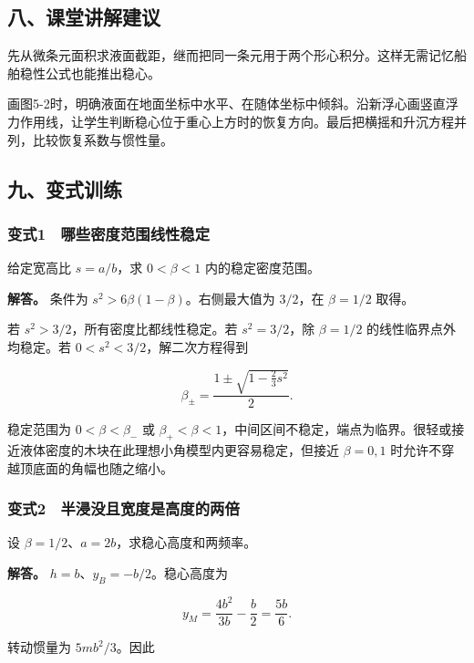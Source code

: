 \documentclass[12pt,a4paper,fontset=fandol]{ctexart}
\begin{document}
\subsection{八、课堂讲解建议}\label{ux516bux8bfeux5802ux8bb2ux89e3ux5efaux8bae-4}

先从微条元面积求液面截距，继而把同一条元用于两个形心积分。这样无需记忆船舶稳性公式也能推出稳心。

画图5-2时，明确液面在地面坐标中水平、在随体坐标中倾斜。沿新浮心画竖直浮力作用线，让学生判断稳心位于重心上方时的恢复方向。最后把横摇和升沉方程并列，比较恢复系数与惯性量。

\subsection{九、变式训练}\label{ux4e5dux53d8ux5f0fux8badux7ec3-4}

\subsubsection{变式1　哪些密度范围线性稳定}\label{ux53d8ux5f0f1-ux54eaux4e9bux5bc6ux5ea6ux8303ux56f4ux7ebfux6027ux7a33ux5b9a}

给定宽高比 \(s=a/b\)，求 \(0<\beta<1\) 内的稳定密度范围。

\textbf{解答。} 条件为 \(s^2>6\beta(1-\beta)\)。右侧最大值为 \(3/2\)，在
\(\beta=1/2\) 取得。

若 \(s^2>3/2\)，所有密度比都线性稳定。若 \(s^2=3/2\)，除 \(\beta=1/2\)
的线性临界点外均稳定。若 \(0<s^2<3/2\)，解二次方程得到

\[
\beta_\pm=\frac{1\pm\sqrt{1-\frac23s^2}}2.
\]

稳定范围为 \(0<\beta<\beta_-\) 或
\(\beta_+<\beta<1\)，中间区间不稳定，端点为临界。很轻或接近液体密度的木块在此理想小角模型内更容易稳定，但接近
\(\beta=0,1\) 时允许不穿越顶底面的角幅也随之缩小。

\subsubsection{变式2　半浸没且宽度是高度的两倍}\label{ux53d8ux5f0f2-ux534aux6d78ux6ca1ux4e14ux5bbdux5ea6ux662fux9ad8ux5ea6ux7684ux4e24ux500d}

设 \(\beta=1/2\)、\(a=2b\)，求稳心高度和两频率。

\textbf{解答。} \(h=b\)、\(y_B=-b/2\)。稳心高度为

\[
y_M=\frac{4b^2}{3b}-\frac b2=\frac{5b}{6}.
\]

转动惯量为 \(5mb^2/3\)。因此
\end{document}
